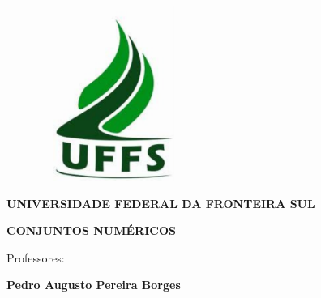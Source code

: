 \documentclass[12pt]{article}
\renewcommand{\_}{\kern-1.5pt\textunderscore\kern-1.5pt}
\begin{document}

\begin{figure}[H]
	\begin{Center}
		\includegraphics[width=1.92in,height=2.24in]{./media/image1.pdf}
	\end{Center}
\end{figure}



\setlength{\parskip}{0.0pt}
\par


\vspace{\baselineskip}
\setlength{\parskip}{8.04pt}
\begin{Center}
{\fontsize{18pt}{21.6pt}\selectfont \textbf{UNIVERSIDADE FEDERAL DA FRONTEIRA SUL}\par}
\end{Center}\par


\vspace{\baselineskip}

\vspace{\baselineskip}

\vspace{\baselineskip}
\begin{Center}
{\fontsize{24pt}{28.8pt}\selectfont \textbf{CONJUNTOS NUMÉRICOS}\par}
\end{Center}\par


\vspace{\baselineskip}
\begin{Center}
{\fontsize{16pt}{19.2pt}\selectfont Professores:\par}
\end{Center}\par

\begin{Center}
{\fontsize{20pt}{24.0pt}\selectfont \textbf{Pedro Augusto Pereira Borges}\par}
\end{Center}\par
\end{document}
